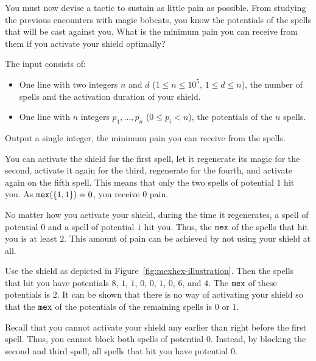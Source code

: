 You must now devise a tactic to sustain as little pain as possible.
From studying the previous encounters with magic bobcats, you know the potentials of the spells that will be cast against you.
What is the minimum pain you can receive from them if you activate your shield optimally?

\begin{Input}
	The input consists of:
	\begin{itemize}
		\item One line with two integers $n$ and $d$ ($1 \leq n \leq 10^5$, $1 \leq d \leq n$), the number of spells and the activation duration of your shield.
		\item One line with $n$ integers $p_1, \dots, p_n$ ($0 \leq p_i < n$), the potentials of the $n$ spells.
	\end{itemize}
\end{Input}

\begin{Output}
	Output a single integer, the minimum pain you can receive from the spells.
\end{Output}

\nextsample
You can activate the shield for the first spell, let it regenerate its magic for the second, activate it again for the third, regenerate for the fourth, and activate again on the fifth spell.
This means that only the two spells of potential $1$ hit you.
As $\mathtt{mex}(\{1, 1\}) = 0$, you receive $0$ pain.

\nextsample
No matter how you activate your shield, during the time it regenerates, a spell of potential $0$ and a spell of potential $1$ hit you.
Thus, the $\mathtt{mex}$ of the spells that hit you is at least $2$.
This amount of pain can be achieved by not using your shield at all.

\nextsample
Use the shield as depicted in Figure~\ref{fig:mexhex-illustration}.
Then the spells that hit you have potentials $8$, $1$, $1$, $0$, $0$, $1$, $0$, $6$, and $4$.
The $\mathtt{mex}$ of these potentials is $2$.
It can be shown that there is no way of activating your shield so that the $\mathtt{mex}$ of the potentials of the remaining spells is $0$ or $1$.

\nextsample
Recall that you cannot activate your shield any earlier than right before the first spell.
Thus, you cannot block both spells of potential $0$.
Instead, by blocking the second and third spell, all spells that hit you have potential $0$.
